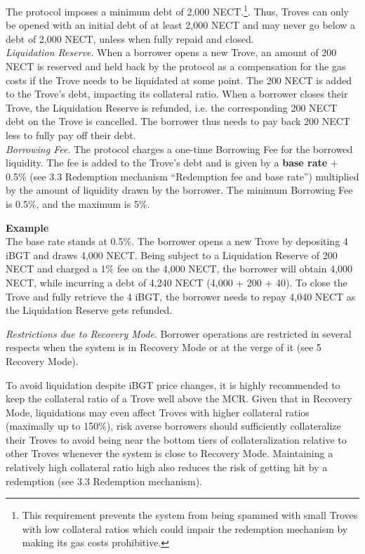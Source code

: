 \documentclass{article}
\begin{document}
The protocol imposes a minimum debt of 2,000 NECT.\footnote{This requirement prevents the system from being spammed with small Troves with low collateral ratios which could impair the redemption mechanism by making its gas costs prohibitive.}. Thus, Troves can only be opened with an initial debt of at least 2,000 NECT and may never go below a debt of 2,000 NECT, unless when fully repaid and closed.
\\


\textit{Liquidation Reserve}. When a borrower opens a new Trove, an amount of 200 NECT is reserved and held back by the protocol as a compensation for the gas costs if the Trove needs to be liquidated at some point. The 200 NECT is added to the Trove's debt, impacting its collateral ratio. When a borrower closes their Trove, the Liquidation Reserve is refunded, i.e. the corresponding 200 NECT debt on the Trove is cancelled. The borrower thus needs to pay back 200 NECT less to fully pay off their debt. \\

\textit{Borrowing Fee}.   The protocol charges a one-time Borrowing Fee for the borrowed liquidity. The fee is added to the Trove's debt and is given by a \textbf{base rate} + 0.5\% (see 3.3 Redemption mechanism “Redemption fee and base rate”) multiplied by the amount of liquidity drawn by the borrower. The minimum Borrowing Fee is 0.5\%, and the maximum is 5\%. \\

\begin{tcolorbox}
\textbf{Example}\\
The base rate stands at 0.5\%. The borrower opens a new Trove by depositing 4 iBGT and draws 4,000 NECT. Being subject to a Liquidation Reserve of 200 NECT and charged a 1\% fee on the 4,000 NECT, the borrower will obtain 4,000 NECT, while incurring a debt of 4,240 NECT (4,000 + 200 + 40). To close the Trove and fully retrieve the 4 iBGT, the borrower needs to repay 4,040 NECT as the Liquidation Reserve gets refunded.
\end{tcolorbox}

\textit{Restrictions due to Recovery Mode}.   Borrower operations are restricted in several respects when the system is in Recovery Mode or at the verge of it (see 5 Recovery Mode). 

To avoid liquidation despite iBGT price changes, it is highly recommended to keep the collateral ratio of a Trove well above the MCR. Given that in Recovery Mode, liquidations may even affect Troves with higher collateral ratios (maximally up to 150\%), risk averse borrowers should sufficiently collateralize their Troves to avoid being near the bottom tiers of collateralization relative to other Troves whenever the system is close to Recovery Mode. Maintaining a relatively high collateral ratio high also reduces the risk of getting hit by a redemption (see 3.3 Redemption mechanism).
\end{document}
